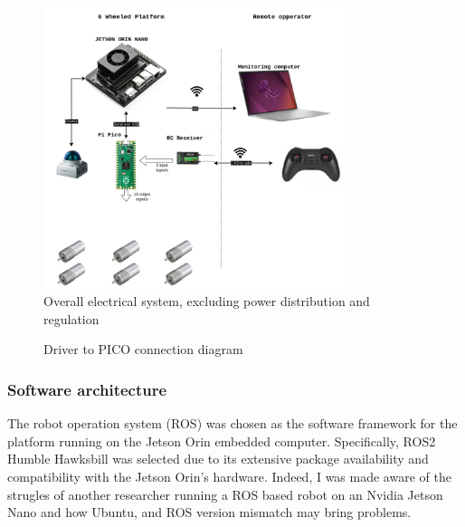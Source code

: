 \documentclass[11pt]{article}
\begin{document}
                \begin{figure}[H]
                    \centering
                    
                    \includegraphics[width=0.8\textwidth]{Images/PFE-Page-2.drawio.png}
                    \caption{Overall electrical system, excluding power distribution and regulation}
                    \label{fig:overall_electical_system}
                \end{figure}


                
                
                \begin{figure}[h]
                    \centering
                    Driver to PICO connection diagram
                    \label{fig:driver_to_pico}
                \end{figure}

            
            
            \subsubsection{Software architecture}


            The robot operation system (ROS) was chosen as the software framework for the platform running on the Jetson Orin embedded computer. Specifically, ROS2 Humble Hawksbill was selected due to its extensive package availability and compatibility with the Jetson Orin's hardware. Indeed, I was made aware of the strugles of another researcher running a ROS based robot on an Nvidia Jetson Nano and how Ubuntu, and ROS version mismatch may bring problems. 
            
\end{document}
